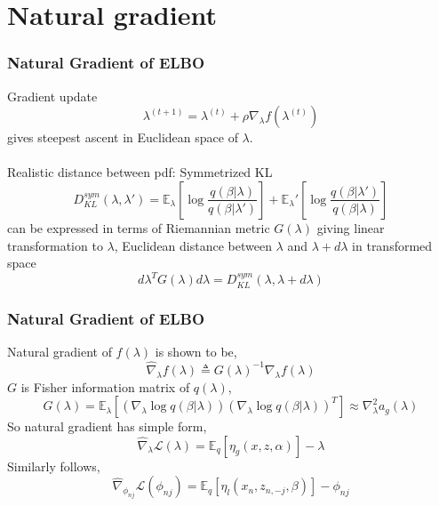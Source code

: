 \documentclass{beamer}
\newcommand{\E}{\mathbb{E}}
\renewcommand{\L}{\mathcal{L}}
\begin{document}

\section{Natural gradient}
\begin{frame}
\frametitle{Natural Gradient of ELBO}
Gradient update
\[
\lambda^{(t+1)}=\lambda^{(t)}+\rho\nabla_\lambda f(\lambda^{(t)})
\]
gives steepest ascent in Euclidean space of $\lambda$.\\~\\

Realistic distance between pdf: Symmetrized KL
\[
D^{sym}_{KL}(\lambda,\lambda')=\E_\lambda\left[\log\frac{q(\beta|\lambda)}{q(\beta|\lambda')}\right] + \E_\lambda'\left[\log\frac{q(\beta|\lambda')}{q(\beta|\lambda)}\right]
\]
can be expressed in terms of Riemannian metric $G(\lambda)$ giving linear transformation to $\lambda$, Euclidean distance between $\lambda$ and $\lambda+d\lambda$ in transformed space
\[
d\lambda^TG(\lambda)d\lambda = D^{sym}_{KL}(\lambda,\lambda+d\lambda)
\]
\end{frame}


\begin{frame}
\frametitle{Natural Gradient of ELBO}
Natural gradient of $f(\lambda)$ is shown to be,
\[
\hat{\nabla}_\lambda f(\lambda) \triangleq G(\lambda)^{-1}\nabla_\lambda f(\lambda)
\]
$G$ is Fisher information matrix of $q(\lambda)$,
\[
G(\lambda)=\E_\lambda\left[(\nabla_\lambda\log q(\beta|\lambda))(\nabla_\lambda\log q(\beta|\lambda))^T\right] \approx \nabla_\lambda^2a_g(\lambda)
\]
So natural gradient has simple form,
\[
\hat{\nabla}_\lambda \L(\lambda) = \E_q[\eta_g(x,z,\alpha)]-\lambda
\]
Similarly follows,
\[
\hat{\nabla}_{\phi_{nj}} \L(\phi_{nj}) = \E_q[\eta_l(x_n,z_{n,-j},\beta)]-\phi_{nj}
\]
\end{frame}
\end{document}
